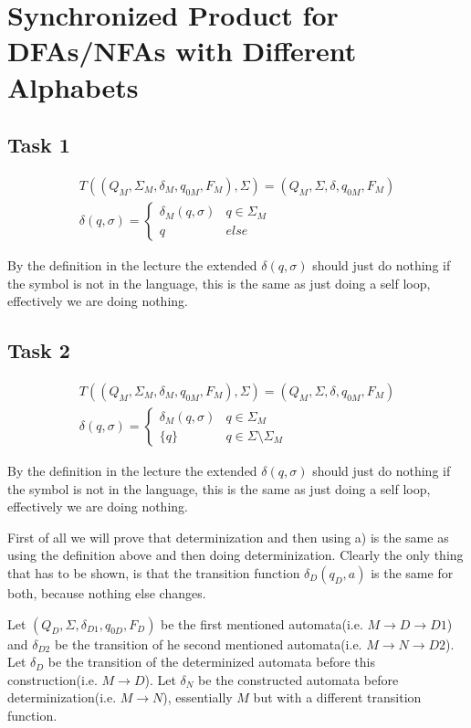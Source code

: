 \section{Synchronized Product for DFAs/NFAs with Different Alphabets}
\subsection{Task 1}

\begin{align*}
T((Q_M,\Sigma_M,\delta_M,q_{0 M},F_M),\Sigma) = (Q_M,\Sigma,\delta,q_{0 M},F_M)\\
\delta(q,\sigma)=
\begin{cases} 
      \delta_M(q,\sigma) & q\in \Sigma_M\\
      q & else
   \end{cases}
\end{align*}

By the definition in the lecture the extended $\delta(q,\sigma)$ should just do nothing if the symbol is not in the language, this is the same as just doing a self loop, effectively we are doing nothing.

\subsection{Task 2}

\begin{align*}
T((Q_M,\Sigma_M,\delta_M,q_{0 M},F_M),\Sigma) = (Q_M,\Sigma,\delta,q_{0 M},F_M)\\
\delta(q,\sigma)=
\begin{cases} 
      \delta_M(q,\sigma) 	& q \in \Sigma_M\\
      \{q\} 				& q \in \Sigma \setminus \Sigma_M
   \end{cases}
\end{align*}

By the definition in the lecture the extended $\delta(q,\sigma)$ should just do nothing if the symbol is not in the language, this is the same as just doing a self loop, effectively we are doing nothing.

First of all we will prove that determinization and then using a) is the same as using the definition above and then doing determinization. Clearly the only thing that has to be shown, is that the transition function $\delta_D(q_D,a)$ is the same for both, because nothing else changes.

Let $(Q_D,\Sigma,\delta_{D1},q_{0 D},F_D)$ be the first mentioned automata(i.e. $M \rightarrow D \rightarrow D1$) and $\delta_{D2}$ be the transition of he second mentioned automata(i.e. $M \rightarrow N \rightarrow D2$). Let $\delta_D$ be the transition of the determinized automata before this construction(i.e. $M \rightarrow D$). Let $\delta_N$ be the constructed automata before determinization(i.e. $M \rightarrow N$), essentially $M$ but with a different transition function.

